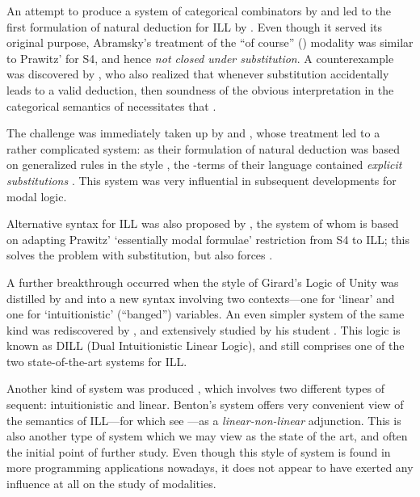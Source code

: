 \documentclass[a4paper]{amsart}
\begin{document}
An attempt to produce a system of categorical combinators by
\cite{Girard1986} and \cite{Lafont1988} led to the first
formulation of natural deduction for \textsf{ILL} by
\cite{Abramsky1990, Abramsky1993}. Even though it served
its original purpose, Abramsky's treatment of the ``of course''
() modality was similar to Prawitz' for \textsf{S4}, and hence
\emph{not closed under substitution}. A counterexample was
discovered by \cite{Wadler1991, Wadler1992, Wadler1994}, who also
realized that whenever substitution accidentally leads to a valid
deduction, then soundness of the obvious interpretation in the
categorical semantics of \cite{Seely1989} necessitates that .

The challenge was immediately taken up by \cite{Bierman1992} and
\cite{Benton1993b}, whose treatment led to a rather complicated
system: as their formulation of natural deduction was based on
generalized rules in the style \cite{Schroeder-Heister1984}, the
-terms of their language contained \emph{explicit
substitutions} \citep{Abadi1991}. This system was very influential
in subsequent developments for modal logic.

Alternative syntax for \textsf{ILL} was also proposed by
\cite{Troelstra1995}, the system of whom is based on adapting
Prawitz' `essentially modal formulae' restriction from \textsf{S4} to
\textsf{ILL}; this solves the problem with substitution, but also forces
.

A further breakthrough occurred when the style of Girard's Logic
of Unity \citep{Girard1993} was distilled by \cite{Andreoli1992}
and \cite{Wadler1993, Wadler1994} into a new syntax involving two
contexts---one for `linear' and one for `intuitionistic'
(``banged'') variables. An even simpler system of the same kind
was rediscovered by \cite{Plotkin1993}, and extensively studied by
his student \cite{Barber1996, Barber1997}. This logic is known as
\textsf{DILL} (Dual Intuitionistic Linear Logic), and still
comprises one of the two state-of-the-art systems for
\textsf{ILL}.

Another kind of system was produced \cite{Benton1994}, which
involves two different types of sequent: intuitionistic and
linear. Benton's system offers very convenient view of the
semantics of \textsf{ILL}---for which see \cite{Mellies2009}---as a
\emph{linear-non-linear} adjunction. This is also another type of
system which we may view as the state of the art, and often the
initial point of further study. Even though this style of system
is found in more programming applications nowadays, it does not
appear to have exerted any influence at all on the study of
modalities.
\end{document}
